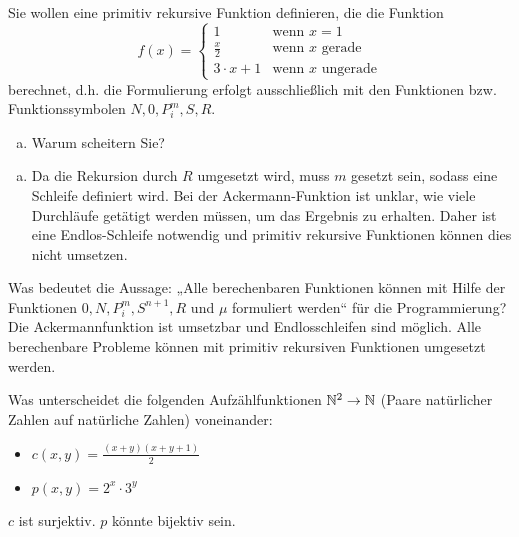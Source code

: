 \begin{card}
Sie wollen eine primitiv rekursive Funktion definieren, die die Funktion
\[
f(x) =
\begin{cases}
1 & \text{wenn $x = 1$} \\
  \frac{x}{2} & \text{wenn $x$ gerade} \\
3 \cdot x + 1 &\text{wenn $x$ ungerade}
\end{cases}
\]
berechnet, d.h. die Formulierung erfolgt ausschließlich mit den Funktionen bzw. Funktionssymbolen $N, 0, P^m_i , S, R$.
  \begin{enumerate}[a)]
    \item Warum scheitern Sie?
  \end{enumerate}
  \hr
  \begin{enumerate}[a)]
    \item Da die Rekursion durch $R$ umgesetzt wird, muss $m$ gesetzt sein, sodass eine Schleife definiert wird. Bei der Ackermann-Funktion ist unklar, wie viele Durchläufe getätigt werden müssen, um das Ergebnis zu erhalten. Daher ist eine Endlos-Schleife notwendig und primitiv rekursive Funktionen können dies nicht umsetzen.
  \end{enumerate}
\end{card}

\begin{card}
  Was bedeutet die Aussage: „Alle berechenbaren Funktionen können mit Hilfe der Funktionen $0, N, P^m_i, S^{n+1}, R$ und $\mu$ formuliert werden“ für die Programmierung?
  \hr
  Die Ackermannfunktion ist umsetzbar und Endlosschleifen sind möglich. Alle berechenbare Probleme können mit primitiv rekursiven Funktionen umgesetzt werden.
\end{card}

\begin{card}
  Was unterscheidet die folgenden Aufzählfunktionen $\mathbb{N}^2 \rightarrow \mathbb{N}$ (Paare natürlicher Zahlen auf natürliche Zahlen) voneinander:
  \begin{itemize}
    \item $c(x, y) = \frac{(x + y)(x + y + 1)}{2}$
    \item $p(x, y) = 2^x \cdot 3^y$
  \end{itemize}
  \hr
  $c$ ist surjektiv. $p$ könnte bijektiv sein.
\end{card}
